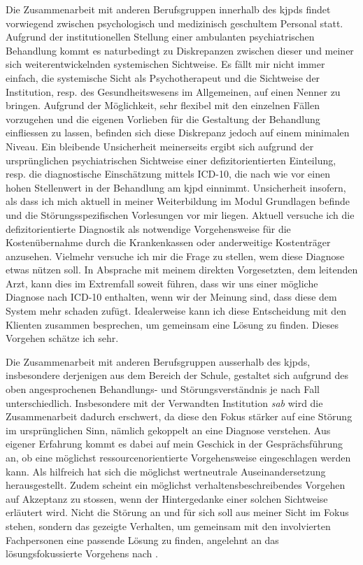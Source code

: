 Die Zusammenarbeit mit anderen Berufsgruppen innerhalb des \ac{kjpd}s findet vorwiegend zwischen psychologisch und medizinisch geschultem Personal statt. Aufgrund der institutionellen Stellung einer ambulanten psychiatrischen Behandlung kommt es naturbedingt zu Diskrepanzen zwischen dieser und meiner sich weiterentwickelnden systemischen Sichtweise. Es fällt mir nicht immer einfach, die systemische Sicht als Psychotherapeut und die Sichtweise der Institution, resp. des Gesundheitswesens im Allgemeinen, auf einen Nenner zu bringen. Aufgrund der Möglichkeit, sehr flexibel mit den einzelnen Fällen vorzugehen und die eigenen Vorlieben für die Gestaltung der Behandlung einfliessen zu lassen, befinden sich diese Diskrepanz jedoch auf einem minimalen Niveau. Ein bleibende  Unsicherheit meinerseits ergibt sich aufgrund der ursprünglichen psychiatrischen Sichtweise einer defizitorientierten Einteilung, resp. die diagnostische Einschätzung mittels  ICD-10, die nach wie vor einen hohen Stellenwert in der Behandlung am \ac{kjpd} einnimmt. Unsicherheit insofern, als dass ich mich aktuell in meiner Weiterbildung im Modul Grundlagen befinde und die Störungsspezifischen Vorlesungen vor mir liegen. Aktuell versuche ich die defizitorientierte Diagnostik als notwendige Vorgehensweise für die Kostenübernahme durch die Krankenkassen oder anderweitige Kostenträger anzusehen. Vielmehr versuche ich mir die Frage zu stellen, wem diese Diagnose etwas nützen soll. In Absprache mit meinem direkten Vorgesetzten, dem leitenden Arzt, kann dies im Extremfall soweit führen, dass wir uns einer mögliche Diagnose nach ICD-10 enthalten, wenn wir der Meinung sind, dass diese dem System mehr schaden zufügt. Idealerweise kann ich diese Entscheidung mit den Klienten zusammen besprechen, um gemeinsam eine Lösung zu finden. Dieses Vorgehen schätze ich sehr.

Die Zusammenarbeit mit anderen Berufsgruppen ausserhalb des \ac{kjpd}s, insbesondere derjenigen aus dem Bereich der Schule, gestaltet sich aufgrund des oben angesprochenen Behandlungs- und Störungsverständnis je nach Fall unterschiedlich. Insbesondere mit der Verwandten Institution \textit{\ac{sab}} wird die Zusammenarbeit dadurch erschwert, da diese den Fokus stärker auf eine Störung im ursprünglichen Sinn, nämlich gekoppelt an eine Diagnose verstehen. Aus eigener Erfahrung kommt es dabei auf mein Geschick in der Gesprächsführung an, ob eine möglichst ressourcenorientierte Vorgehensweise eingeschlagen werden kann. Als hilfreich hat sich die möglichst wertneutrale Auseinandersetzung herausgestellt. Zudem scheint ein möglichst verhaltensbeschreibendes Vorgehen auf Akzeptanz zu stossen, wenn der Hintergedanke einer solchen Sichtweise erläutert wird. Nicht die Störung an und für sich soll aus meiner Sicht im Fokus stehen, sondern das gezeigte Verhalten, um gemeinsam mit den involvierten Fachpersonen eine passende Lösung zu finden, angelehnt an das lösungsfokussierte Vorgehens nach . 
 
